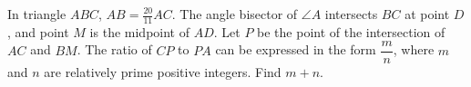 In triangle $ABC$, $AB=\frac{20}{11} AC$. The angle bisector of $\angle A$ intersects $BC$ at point $D$, and point $M$ is the midpoint of $AD$. Let $P$ be the point of the intersection of $AC$ and $BM$. The ratio of $CP$ to $PA$ can be expressed in the form $\dfrac{m}{n}$, where $m$ and $n$ are relatively prime positive integers. Find $m+n$.